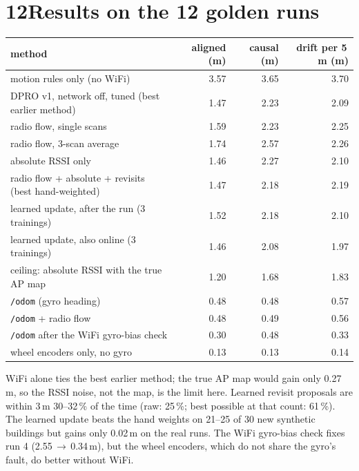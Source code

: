\documentclass[11pt]{article}
\begin{document}
\section*{12\quad Results on the 12 golden runs}
\begin{center}\small
\begin{tabular}{@{}lrrr@{}}
\toprule
method & aligned (m) & causal (m) & drift per 5\,m (m) \\
\midrule
motion rules only (no WiFi) & 3.57 & 3.65 & 3.70 \\
DPRO v1, network off, tuned (best earlier method) & 1.47 & 2.23 & 2.09 \\
radio flow, single scans & 1.59 & 2.23 & 2.25 \\
radio flow, 3-scan average & 1.74 & 2.57 & 2.26 \\
absolute RSSI only & 1.46 & 2.27 & 2.10 \\
radio flow + absolute + revisits (best hand-weighted) & 1.47 & 2.18 & 2.19 \\
learned update, after the run (3 trainings) & 1.52 & 2.18 & 2.10 \\
learned update, also online (3 trainings) & 1.46 & 2.08 & 1.97 \\
ceiling: absolute RSSI with the true AP map & 1.20 & 1.68 & 1.83 \\
\midrule
\texttt{/odom} (gyro heading) & 0.48 & 0.48 & 0.57 \\
\texttt{/odom} + radio flow & 0.48 & 0.49 & 0.56 \\
\texttt{/odom} after the WiFi gyro-bias check & 0.30 & 0.48 & 0.33 \\
wheel encoders only, no gyro & 0.13 & 0.13 & 0.14 \\
\bottomrule
\end{tabular}
\end{center}
WiFi alone ties the best earlier method; the true AP map would gain only 0.27\,m, so the RSSI noise, not the
map, is the limit here. Learned revisit proposals are within 3\,m 30--32\,\% of the time (raw: 25\,\%; best
possible at that count: 61\,\%). The learned update beats the hand weights on 21--25 of 30 new synthetic
buildings but gains only 0.02\,m on the real runs. The WiFi gyro-bias check fixes run 4 (2.55\,$\to$\,0.34\,m),
but the wheel encoders, which do not share the gyro's fault, do better without WiFi.
\end{document}

